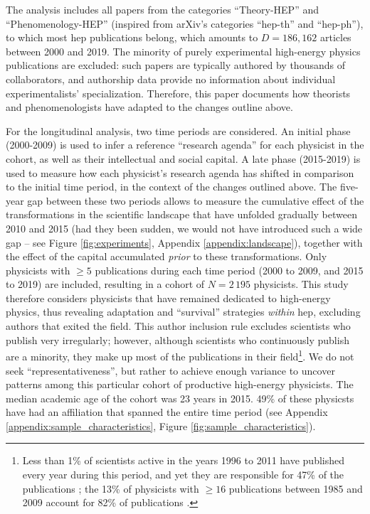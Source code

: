 \documentclass{article}
\begin{document}
The analysis includes all papers from the categories ``Theory-HEP'' and ``Phenomenology-HEP'' (inspired from arXiv's categories ``hep-th'' and ``hep-ph''), to which most \gls{hep} publications belong, which amounts to $D=186,162$ articles between 2000 and 2019. The minority of purely experimental high-energy physics publications are excluded: such papers are typically authored by thousands of collaborators, and authorship data provide no information about individual experimentalists' specialization. Therefore, this paper documents how theorists and phenomenologists have adapted to the changes outline above.

For the longitudinal analysis, two time periods are considered. An initial phase (2000-2009) is used to infer a reference ``research agenda'' for each physicist in the cohort, as well as their intellectual and social capital. A late phase (2015-2019) is used to measure how each physicist's research agenda has shifted in comparison to the initial time period, in the context of the changes outlined above. The five-year gap between these two periods allows to measure the cumulative effect of the transformations in the scientific landscape that have unfolded gradually between 2010 and 2015 (had they been sudden, we would not have introduced such a wide gap -- see Figure \ref{fig:experiments}, Appendix \ref{appendix:landscape}), together with the effect of the capital accumulated \textit{prior} to these transformations. Only physicists with $\geq 5$ publications during each time period (2000 to 2009, and 2015 to 2019) are included, resulting in a cohort of $N=2\,195$ physicists. This study therefore considers physicists that have remained dedicated to high-energy physics, thus revealing adaptation and ``survival'' strategies \textit{within} \gls{hep}, excluding authors that exited the field. This author inclusion rule excludes scientists who publish very irregularly; however, although scientists who continuously publish are a minority, they make up most of the publications in their field\footnote{Less than 1\% of scientists active in the years 1996 to 2011 have published every year during this period, and yet they are responsible for 47\% of the publications \citep{Ioannidis2014}; the 13\% of physicists with $\geq 16$ publications between 1985 and 2009 account for 82\% of publications \citep{liu2024science}.}. We do not seek ``representativeness'', but rather to achieve enough variance to uncover patterns among this particular cohort of productive high-energy physicists. The median academic age of the cohort was 23 years in 2015. 49\% of these physicsts have had an affiliation that spanned the entire time period (see Appendix \ref{appendix:sample_characteristics}, Figure \ref{fig:sample_characteristics}). 
\end{document}
